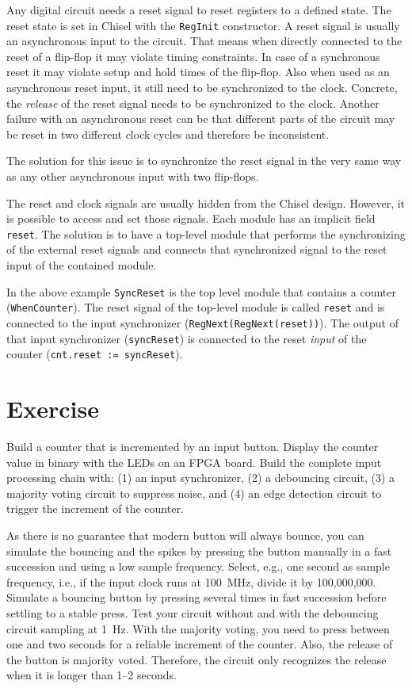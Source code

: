 \documentclass[%
    10pt,
    headinclude, footexclude,
    openright, %
    notitlepage,
    cleardoubleempty,
    headsepline,
    pointlessnumbers,
    bibtotoc, idxtotoc,
    ]{scrbook}
\newcommand{\code}[1]{{\small{\texttt{#1}}}}
\begin{document}
Any digital circuit needs a reset signal to reset registers to a defined state. The reset state is
set in Chisel with the \code{RegInit} constructor. A reset signal is usually an asynchronous
input to the circuit. That means when directly connected to the reset of a flip-flop it may
violate timing constraints. In case of a synchronous reset it may violate setup and hold times
of the flip-flop. Also when used as an asynchronous reset input, it still need to be synchronized
to the clock. Concrete, the \emph{release} of the reset signal needs to be synchronized to the clock.
Another failure with an asynchronous reset can be that different parts of the circuit may be
reset in two different clock cycles and therefore be inconsistent.

The solution for this issue is to synchronize the reset signal in the very same way as
any other asynchronous input with two flip-flops.

The reset and clock signals are usually hidden from the Chisel design.
However, it is possible to access and set those signals. Each module has an implicit field
\code{reset}. The solution is to have a top-level module that performs the synchronizing
of the external reset signals and connects that synchronized signal to the reset input
of the contained module.


In the above example \code{SyncReset} is the top level module that contains a
counter (\code{WhenCounter}). The reset signal of the top-level module is called
\code{reset} and is connected to the input synchronizer (\code{RegNext(RegNext(reset))}).
The output of that input synchronizer (\code{syncReset}) is connected to the reset \emph{input}
of the counter (\code{cnt.reset := syncReset}).


\section{Exercise}

Build a counter that is incremented by an input button.
Display the counter value in binary with the LEDs on an FPGA board.
Build the complete input processing chain with: (1) an input synchronizer,
(2) a debouncing circuit, (3) a majority voting circuit to suppress noise,
and (4) an edge detection circuit to trigger the increment of the counter.

As there is no guarantee that modern button will always bounce, you can
simulate the bouncing and the spikes by pressing the button manually in a fast succession
and using a low sample frequency. Select, e.g., one second as sample frequency,
i.e., if the input clock runs at 100~MHz, divide it by 100,000,000.
Simulate a bouncing button by pressing several times in fast succession
before settling to a stable press. Test your circuit without and with the
debouncing circuit sampling at 1~Hz.
With the majority voting, you need to press between one and two seconds
for a reliable increment of the counter. Also, the release of the button is
majority voted. Therefore, the circuit only recognizes the release when it is
longer than 1--2 seconds.
\end{document}
